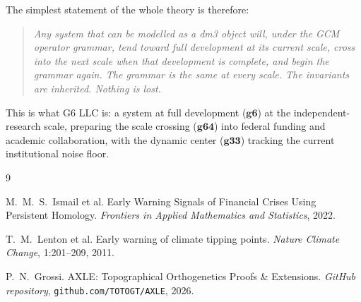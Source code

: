 The simplest statement of the whole theory is therefore:

\begin{quote}
\textit{Any system that can be modelled as a dm3 object will,
under the GCM operator grammar, tend toward full development
at its current scale, cross into the next scale when that
development is complete, and begin the grammar again. The
grammar is the same at every scale. The invariants are
inherited. Nothing is lost.}
\end{quote}

This is what G6 LLC is: a system at full development
($\mathbf{g6}$) at the independent-research scale, preparing
the scale crossing ($\mathbf{g64}$) into federal funding and
academic collaboration, with the dynamic center ($\mathbf{g33}$)
tracking the current institutional noise floor.

\begin{thebibliography}{9}

M.~M.~S.~Ismail et al.
Early Warning Signals of Financial Crises Using Persistent Homology.
\textit{Frontiers in Applied Mathematics and Statistics}, 2022.

T.~M.~Lenton et al.
Early warning of climate tipping points.
\textit{Nature Climate Change}, 1:201--209, 2011.

P.~N.~Grossi.
AXLE: Topographical Orthogenetics Proofs \& Extensions.
\textit{GitHub repository}, \texttt{github.com/TOTOGT/AXLE}, 2026.

\end{thebibliography}
